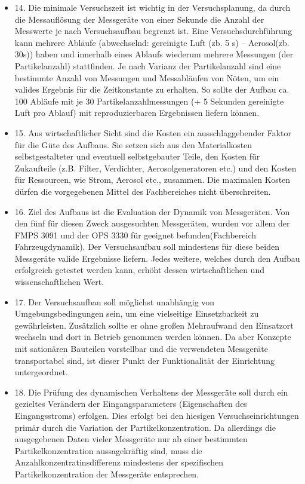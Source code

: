 \begin{itemize}
\item 14. Die minimale Versuchszeit ist wichtig in der Versuchsplanung, da durch die Messaufl\"{o}sung der Messger\"{a}te von einer Sekunde die Anzahl der Messwerte je nach Versuchsaufbau begrenzt ist. Eine Versuchsdurchf\"{u}hrung kann mehrere Abl\"{a}ufe (abwechselnd: gereinigte Luft (zb. 5 s) -- Aerosol(zb. 30s)) haben und innerhalb eines Ablaufs wiederum mehrere Messungen (der Partikelanzahl) stattfinden. Je nach Varianz der Partikelanzahl sind eine bestimmte Anzahl von Messungen und Messabl\"{a}ufen von N\"{o}ten, um ein valides Ergebnis für die Zeitkonstante zu erhalten. So sollte der Aufbau ca. 100 Abl\"{a}ufe mit je 30 Partikelanzahlmessungen (+ 5 Sekunden gereinigte Luft pro Ablauf) mit reproduzierbaren Ergebnissen liefern k\"{o}nnen.

\item 15. Aus wirtschaftlicher Sicht sind die Kosten ein ausschlaggebender Faktor für die G\"{u}te des Aufbaus. Sie setzen sich aus den Materialkosten selbstgestalteter und eventuell selbstgebauter Teile, den Kosten für Zukaufteile (z.B. Filter, Verdichter, Aerosolgeneratoren etc.) und den Kosten f\"{u}r Ressourcen, wie Strom, Aerosol etc., zusammen. Die maximalen Kosten d\"{u}rfen die vorgegebenen Mittel des Fachbereiches nicht \"{u}berschreiten.

\item 16. Ziel des Aufbaus ist die Evaluation der Dynamik von Messger\"{a}ten. Von den f\"{u}nf f\"{u}r diesen Zweck ausgesuchten Messger\"{a}ten, wurden vor allem der FMPS 3091 und der OPS 3330 f\"{u}r geeignet befunden(Fachbereich Fahrzeugdynamik).
Der Versuchsaufbau soll mindestens f\"{u}r diese beiden Messger\"{a}te valide Ergebnisse liefern. Jedes weitere, welches durch den Aufbau erfolgreich getestet werden kann, erh\"{o}ht dessen wirtschaftlichen und wissenschaftlichen Wert. 

\item 17. Der Versuchsaufbau soll m\"{o}glichst unabh\"{a}ngig von Umgebungsbedingungen sein, um eine vielseitige Einsetzbarkeit zu gew\"{a}hrleisten. Zus\"{a}tzlich sollte er ohne gro{\ss}en Mehraufwand den Einsatzort wechseln und dort in Betrieb genommen werden k\"{o}nnen. Da aber Konzepte mit sation\"{a}ren Bauteilen vorstellbar und die verwendeten Messger\"{a}te transportabel sind, ist dieser Punkt der Funktionalit\"{a}t der Einrichtung untergeordnet.

\item 18. Die Pr\"{u}fung des dynamischen Verhaltens der Messger\"{a}te soll durch ein gezieltes Ver\"{a}ndern der Eingangsparameters (Eigenschaften des Eingangsstroms) erfolgen. Dies erfolgt bei den hiesigen Versuchseinrichtungen prim\"{a}r durch die Variation der Partikelkonzentration. Da allerdings die ausgegebenen Daten vieler Messger\"{a}te nur ab einer bestimmten Partikelkonzentration aussagekr\"{a}ftig sind, muss die Anzahlkonzentratinsdifferenz mindestens der spezifischen Partikelkonzentration der Messger\"{a}te entsprechen. 
\end{itemize}

